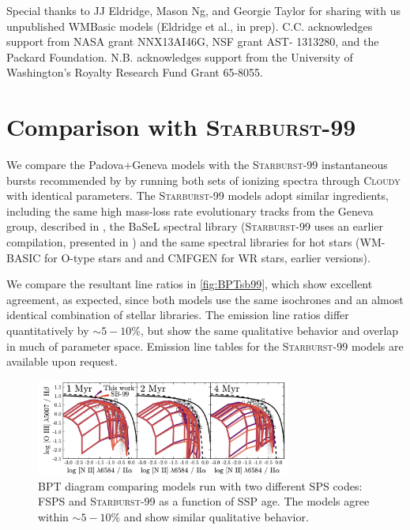 \documentclass[linenumbers, trackchanges, tighten]{aastex61}%
\newcommand{\Fig}[1]{\autoref{fig:#1}}
\newcommand{\SB}{\textsc{Starburst-99}\xspace}
\newcommand{\Cloudy}{\textsc{Cloudy}\xspace}
\begin{document}
\acknowledgments

Special thanks to JJ Eldridge, Mason Ng, and Georgie Taylor for sharing with us unpublished WMBasic models (Eldridge et al., in prep). C.C. acknowledges support from NASA grant NNX13AI46G, NSF grant AST- 1313280, and the Packard Foundation. N.B. acknowledges support from the University of Washington's Royalty Research Fund Grant 65-8055.


\newpage

\appendix

\section{Comparison with \SB}\label{sec:appendix:B}

We compare the Padova+Geneva models with the \SB{} instantaneous bursts recommended by \citet{Levesque10} by running both sets of ionizing spectra through \Cloudy with identical parameters. The \SB{} models adopt similar ingredients, including the same high mass-loss rate evolutionary tracks from the Geneva group, described in \citet{Meynet00}, the BaSeL spectral library (\SB uses an earlier compilation, presented in \citet{Lejeune}) and the same spectral libraries for hot stars (WM-BASIC for O-type stars and and CMFGEN for WR stars, earlier versions).

We compare the resultant line ratios in \Fig{BPTsb99}, which show excellent agreement, as expected, since both models use the same isochrones and an almost identical combination of stellar libraries. The emission line ratios differ quantitatively by $\sim5-10\%$, but show the same qualitative behavior and overlap in much of parameter space. Emission line tables for the \SB models are available upon request.

\begin{figure}[!htbp]
  \begin{centering}
    \includegraphics[width=0.75\textwidth]{f32.pdf}
    \caption{BPT diagram comparing models run with two different SPS codes: FSPS and \SB as a function of SSP age. The models agree within $\sim5-10\%$ and show similar qualitative behavior.}
    \label{fig:BPTsb99}
  \end{centering}
\end{figure}
\end{document}
